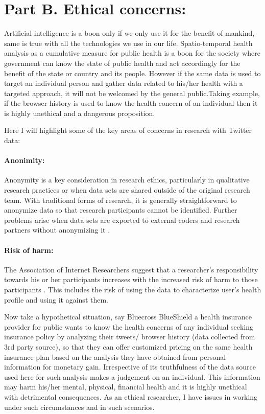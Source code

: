\section{Part B. Ethical concerns:}
\label{part_b}
Artificial intelligence is a boon only if we only use it for the benefit of mankind, same is true with all the technologies we use in our life. Spatio-temporal health analysis as a cumulative measure for public health is a boon for the society where government can know the state of public health and act accordingly for the benefit of the state or country and its people. However if the same data is used to target an individual person and gather data related to his/her health with a targeted approach, it will not be welcomed by the general public.Taking example, if the browser history is used to know the health concern of an individual then it is highly unethical and a dangerous proposition.

Here I will highlight some of the key areas of concerns in research with Twitter data:

\vspace{-2mm}
\paragraph{Anonimity:}
Anonymity is a key consideration in research ethics,
particularly in	qualitative	 research practices or when	data sets
are	shared outside of the original research	team. With	traditional
forms	of	research, it	is	generally straightforward to anonymize
data so	that research participants	cannot	be	identified.
Further	 problems arise when  data	sets are
exported to	 external coders and research
partners without anonymizing it \cite{townsend2016social}.

\vspace{-2mm}
\paragraph{Risk of harm:}
The	Association	of Internet Researchers	suggest	that a researcher's
responsibility towards his	or	her	participants increases	with the
increased	risk of	 harm  to	 those	 participants
\cite{townsend2016social}. This includes the risk of using the data to
characterize user's health profile and using it against them.


Now take a hypothetical situation, say Bluecross BlueShield a health insurance
provider for public wants to know the health concerns of any individual seeking
insurance policy by analyzing their tweets/ browser history (data collected
from 3rd party source), so that they can offer customized pricing on the same
health insurance plan based on the analysis they have obtained from personal
information for monetary gain. Irrespective of its truthfulness of the data
source used here for such analysis  makes a judgement on an individual.  This
information may harm his/her mental, physical, financial health and it is
highly unethical with detrimental consequences.
As an ethical researcher, I have issues in working under such circumstances and in such scenarios.

